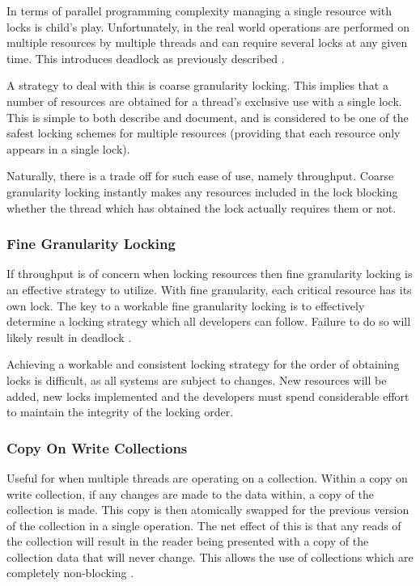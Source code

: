 \documentclass[12pt,a4paper]{article}
\begin{document}
In terms of parallel programming complexity managing a single resource with locks is child's play. Unfortunately, in the real world operations are performed on multiple resources by multiple threads and can require several locks at any given time. This introduces deadlock as previously described \cite{javaConcurrency}.

A strategy to deal with this is coarse granularity locking. This implies that a number of resources are obtained for a thread's exclusive use with a single lock. This is simple to both describe and document, and is considered to be one of the safest locking schemes for multiple resources (providing that each resource only appears in a single lock).

Naturally, there is a trade off for such ease of use, namely throughput. Coarse granularity locking instantly makes any resources included in the lock blocking whether the thread which has obtained the lock actually requires them or not. 

\subsubsection{Fine Granularity Locking}

If throughput is of concern when locking resources then fine granularity locking is an effective strategy to utilize. With fine granularity, each critical resource has its own lock. The key to a workable fine granularity locking is to effectively determine a locking strategy which all developers can follow. Failure to do so will likely result in deadlock \cite{javaConcurrency}.

Achieving a workable and consistent locking strategy for the order of obtaining locks is difficult, as all systems are subject to changes. New resources will be added, new locks implemented and the developers must spend considerable effort to maintain the integrity of the locking order.

\subsubsection{Copy On Write Collections}

Useful for when multiple threads are operating on a collection. Within a copy on write collection, if any changes are made to the data within, a copy of the collection is made. This copy is then atomically swapped for the previous version of the collection in a single operation. The net effect of this is that any reads of the collection will result in the reader being presented with a copy of the collection data that will never change. This allows the use of collections which are completely non-blocking \cite{javaConcurrency}.
\end{document}
